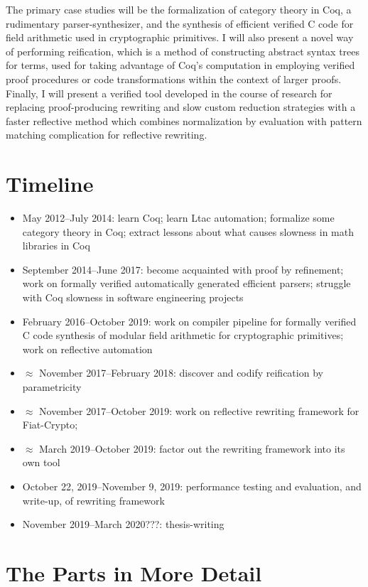 \documentclass[twoside]{article}
\begin{document}
The primary case studies will be the formalization of category theory in Coq, a rudimentary parser-synthesizer, and the synthesis of efficient verified C code for field arithmetic used in cryptographic primitives.
I will also present a novel way of performing reification, which is a method of constructing abstract syntax trees for terms, used for taking advantage of Coq's computation in employing verified proof procedures or code transformations within the context of larger proofs.
Finally, I will present a verified tool developed in the course of research for replacing proof-producing rewriting and slow custom reduction strategies with a faster reflective method which combines normalization by evaluation with pattern matching complication for reflective rewriting.

\section{Timeline}
\begin{itemize}
  \item
    May 2012--July 2014:
    learn Coq;
    learn Ltac automation;
    formalize some category theory in Coq;
    extract lessons about what causes slowness in math libraries in Coq
  \item
    September 2014--June 2017:
    become acquainted with proof by refinement;
    work on formally verified automatically generated efficient parsers;
    struggle with Coq slowness in software engineering projects
  \item
    February 2016--October 2019:
    work on compiler pipeline for formally verified C code synthesis of modular field arithmetic for cryptographic primitives;
    work on reflective automation
  \item
    $\approx$ November 2017--February 2018:
    discover and codify reification by parametricity
  \item
    $\approx$ November 2017--October 2019:
    work on reflective rewriting framework for Fiat-Crypto;
  \item
    $\approx$ March 2019--October 2019:
    factor out the rewriting framework into its own tool
  \item
    October 22, 2019--November 9, 2019:
    performance testing and evaluation, and write-up, of rewriting framework
  \item
    November 2019--March 2020???:
    thesis-writing
\end{itemize}

\section{The Parts in More Detail}
\end{document}
